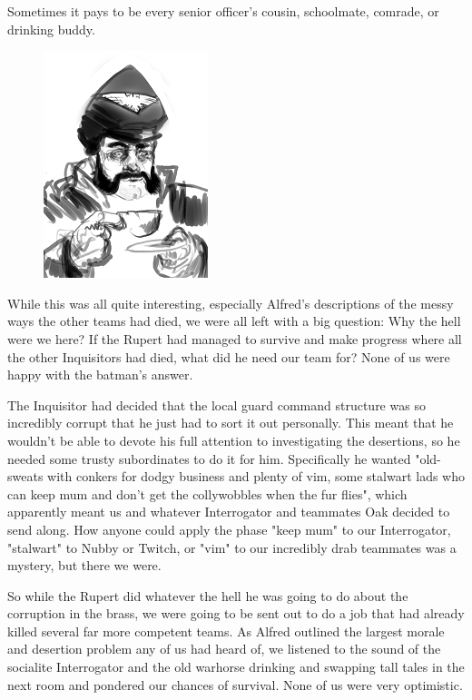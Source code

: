 Sometimes it pays to be every senior officer's cousin, schoolmate, comrade, or drinking buddy.

\begin{figure}
	\begin{center}
		\includegraphics[width=\figwidth]{pics/9/12.png}
	\end{center}
\end{figure}
While this was all quite interesting, especially Alfred's descriptions of the messy ways the other teams had died, we were all left with a big question: 
Why the hell were we here? 
If the Rupert had managed to survive and make progress where all the other Inquisitors had died, what did he need our team for? 
None of us were happy with the batman's answer.

The Inquisitor had decided that the local guard command structure was so incredibly corrupt that he just had to sort it out personally. 
This meant that he wouldn't be able to devote his full attention to investigating the desertions, so he needed some trusty subordinates to do it for him. 
Specifically he wanted "old-sweats with conkers for dodgy business and plenty of vim, some stalwart lads who can keep mum and don't get the collywobbles when the fur flies", which apparently meant us and whatever Interrogator and teammates Oak decided to send along. 
How anyone could apply the phase "keep mum" to our Interrogator, "stalwart" to Nubby or Twitch, or "vim" to our incredibly drab teammates was a mystery, but there we were.

So while the Rupert did whatever the hell he was going to do about the corruption in the brass, we were going to be sent out to do a job that had already killed several far more competent teams. 
As Alfred outlined the largest morale and desertion problem any of us had heard of, we listened to the sound of the socialite Interrogator and the old warhorse drinking and swapping tall tales in the next room and pondered our chances of survival. 
None of us were very optimistic.


